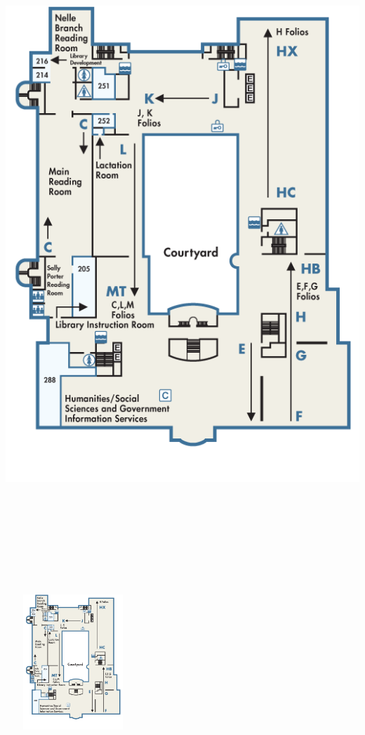 \documentclass{article}
\begin{document}
\includegraphics[height=10in,width=\textwidth]{map-shields-2.png}

\vfill\eject
\includegraphics[height=2in,width=2in]{map-shields-2.png}


\end{document}
